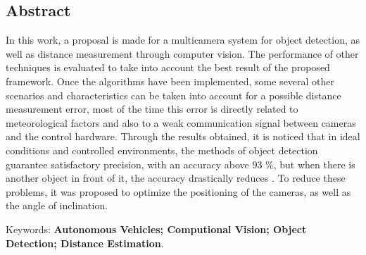 \begin{flushright}
\chapter*{Abstract}
\end{flushright}

\noindent
In this work, a proposal is made for a multicamera system for object detection, as well as distance measurement through computer vision. The performance of other techniques is evaluated to take into account the best result of the proposed framework. Once the algorithms have been implemented, some several other scenarios and characteristics can be taken into account for a possible distance measurement error, most of the time this error is directly related to meteorological factors and also to a weak communication signal between cameras and the control hardware. Through the results obtained, it is noticed that in ideal conditions and controlled environments, the methods of object detection guarantee satisfactory precision, with an accuracy above 93 \%, but when there is another object in front of it, the accuracy drastically reduces . To reduce these problems, it was proposed to optimize the positioning of the cameras, as well as the angle of inclination.


\noindent
Keywords: \textbf{Autonomous Vehicles; Computional Vision; Object Detection; Distance Estimation}.